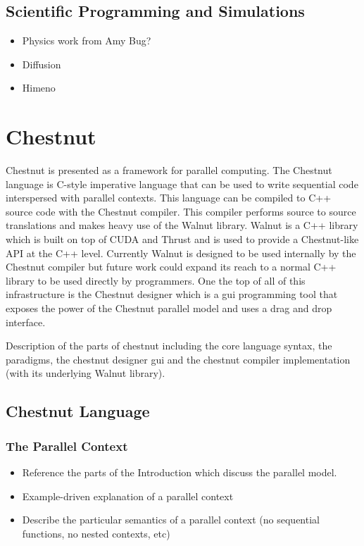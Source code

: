 \subsection{Scientific Programming and Simulations}

\begin{itemize}
\item Physics work from Amy Bug?
\item Diffusion
\item Himeno
\end{itemize}


\section{Chestnut}

Chestnut is presented as a framework for parallel computing. The Chestnut
language is C-style imperative language that can be used to write sequential
code interspersed with parallel contexts. This language can be compiled to C++
source code with the Chestnut compiler. This compiler performs source to source
translations and makes heavy use of the Walnut library. Walnut is a C++ library
which is built on top of CUDA and Thrust and is used to provide a Chestnut-like
API at the C++ level. Currently Walnut is designed to be used internally by the
Chestnut compiler but future work could expand its reach to a normal C++
library to be used directly by programmers. One the top of all of this
infrastructure is the Chestnut designer which is a gui programming tool that
exposes the power of the Chestnut parallel model and uses a drag and drop
interface.

Description of the parts of chestnut including the core language syntax, the
paradigms, the chestnut designer gui and the chestnut compiler implementation
(with its underlying Walnut library).

\subsection{Chestnut Language}


\subsubsection{The Parallel Context}

\begin{itemize}
\item Reference the parts of the Introduction which discuss the parallel model.  
\item Example-driven explanation of a parallel context
\item Describe the particular semantics of a parallel context (no sequential functions, no nested contexts, etc)
\end{itemize}

